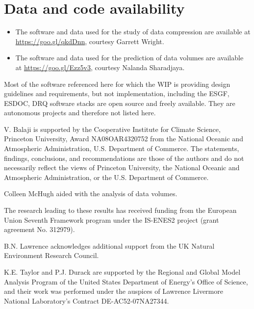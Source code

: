 \documentclass[gmd,manuscript]{copernicus}
\begin{document}
\section{Data and code availability}
\label{sec:code}

\begin{itemize}
\item The software and data used for the study of data compression are
  available at \url{https://goo.gl/qkdDnn}, courtesy Garrett Wright.
\item The software and data used for the prediction of data volumes
  are available at \url{https://goo.gl/Ezz5v3}, courtesy Nalanda
  Sharadjaya.
\end{itemize}

Most of the software referenced here for which the WIP is providing
design guidelines and requirements, but not implementation, including
the ESGF, ESDOC, DRQ software stacks are open source and freely
available. They are autonomous projects and therefore not listed here.

\begin{acknowledgements}
  V. Balaji is supported by the Cooperative Institute for Climate
  Science, Princeton University, Award NA08OAR4320752 from the
  National Oceanic and Atmospheric Administration, U.S. Department of
  Commerce. The statements, findings, conclusions, and recommendations
  are those of the authors and do not necessarily reflect the views of
  Princeton University, the National Oceanic and Atmospheric
  Administration, or the U.S. Department of Commerce.

  Colleen McHugh aided with the analysis of data volumes.
  
  The research leading to these results has received funding from the
  European Union Seventh Framework program under the IS-ENES2 project
  (grant agreement No. 312979).

  B.N. Lawrence acknowledges additional support from the UK Natural
  Environment Research Council.
  
  K.E. Taylor and P.J. Durack are supported by the Regional and Global
  Model Analysis Program of the United States Department of Energy's
  Office of Science, and their work was performed under the auspices
  of Lawrence Livermore National Laboratory's Contract
  DE-AC52-07NA27344.
\end{acknowledgements}



\end{document}
